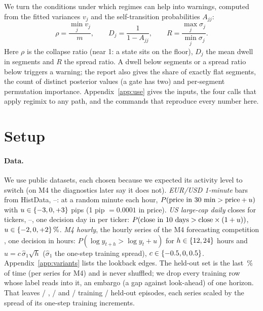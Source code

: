 \documentclass{article}
\begin{document}
We turn the conditions under which regimes can help into warnings, computed from the fitted variances $v_j$ and the self-transition probabilities $A_{jj}$:
\begin{equation}
  \rho = \frac{\min_j v_j}{m},\qquad D_j = \frac{1}{1-A_{jj}},\qquad R = \frac{\max_j\sigma_j}{\min_j\sigma_j}.
  \label{eq:diag}
\end{equation}
Here $\rho$ is the collapse ratio (near 1: a state sits on the floor), $D_j$ the mean dwell in segments and $R$ the spread ratio.
A dwell below \nCfgDwellMin{} segments or a spread ratio below \nCfgSpreadMin{} triggers a warning; the report also gives the share of exactly flat segments, the count of distinct posterior values (a gate has two) and per-segment permutation importance.
Appendix~\ref{app:use} gives the inputs, the four calls that apply regimix to any path, and the commands that reproduce every number here.

\section{Setup}
\label{sec:setup}

\paragraph{Data.}
We use \nCfgNData{} public datasets, each chosen because we expected its activity level to switch (on M4 the diagnostics later say it does not).
\emph{EUR/USD 1-minute} bars from HistData, \nCfgFxYearA--\nCfgFxYearB: at a random minute each hour, $P(\text{price in } 30\text{ min} > \text{price} + u)$ with $u\in\{-3, 0, +3\}$ pips (1 pip $=0.0001$ in price).
\emph{US large-cap daily} closes for \nCfgEqTickers{} tickers, \nCfgEqYearA--\nCfgEqYearB, one decision day in \nCfgEqEvery{} per ticker: $P(\text{close in } 10 \text{ days} > \text{close}\times(1+u))$, $u\in\{-2, 0, +2\}\,\%$.
\emph{M4 hourly}, the hourly series of the M4 forecasting competition \citep{makridakis2020}, one decision in \nCfgMfEvery{} hours: $P(\log y_{t+h}>\log y_t+u)$ for $h\in\{12,24\}$ hours and $u=c\,\hat\sigma_1\sqrt h$ ($\hat\sigma_1$ the one-step training spread), $c\in\{-0.5,0,0.5\}$. Appendix~\ref{app:variants} lists the lookback edges.
The held-out set is the last \nCfgTestPct\,\% of time (per series for M4) and is never shuffled; we drop every training row whose label reads into it, an embargo (a gap against look-ahead) of one horizon.
That leaves \nFxNTrain{} / \nFxNTest, \nEqNTrain{} / \nEqNTest{} and \nMfNTrain{} / \nMfNTest{} training / held-out episodes, each series scaled by the spread of its one-step training increments.
\end{document}
